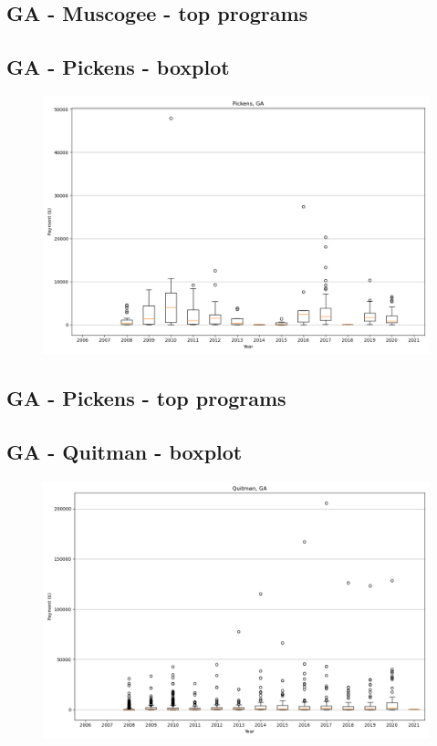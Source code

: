 \subsection*{GA - Muscogee - top programs}

\newpage
\subsection*{GA - Pickens - boxplot}
\begin{figure}[h]
\centering
\includegraphics[width=7in]{../output/boxplots/counties/Pickens-GA_boxplot.png}
\end{figure}


\subsection*{GA - Pickens - top programs}

\newpage
\subsection*{GA - Quitman - boxplot}
\begin{figure}[h]
\centering
\includegraphics[width=7in]{../output/boxplots/counties/Quitman-GA_boxplot.png}
\end{figure}


